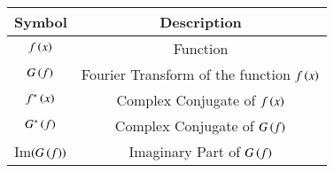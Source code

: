 \begin{tabular}[12pt]{ |c| c|}
    \hline
    \textbf{Symbol} & \textbf{Description}\\ 
    \hline
    $ f\left(x\right) $ & Function \\
    \hline 
    $ G\left(f\right) $ & Fourier Transform of the function $ f\left(x\right) $ \\
    \hline
    $ f^*\left(x\right) $ & Complex Conjugate of $ f\left(x\right) $ \\
    \hline
    $ G^*\left(f\right) $ & Complex Conjugate of $ G\left(f\right) $ \\
    \hline
    Im$ \left( G \left( f \right) \right)$ & Imaginary Part of $ G\left(f\right) $ \\
    \hline
    \end{tabular}